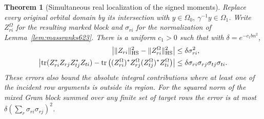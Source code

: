 \documentclass[a4paper,11pt]{article}
\newtheorem{theorem}[proposition]{Theorem}
\theoremstyle{definition}
\theoremstyle{remark}
\numberwithin{equation}{section}
\begin{document}
\begin{theorem}[Simultaneous real localization of the signed moments]
\leavevmode\label{thm:conemoments664}
Replace every original orbital domain by its intersection with
\(y\in\Omega_0,\ \gamma^{-1}y\in\Omega_1\). Write
\(Z_{ri}^{\Omega}\) for the resulting marked block and
\(\sigma_{ri}\) for the normalization of
Lemma~\ref{lem:massranks623}. There is a uniform \(c_1>0\)
such that with \(\delta=e^{-c_1bn^2}\),
\begin{align*}
 \big|\|Z_{ri}\|_{\rm HS}^2-\|Z_{ri}^{\Omega}\|_{\rm HS}^2\big|
   &\le\delta\sigma_{ri}^2,\\
 \left|\operatorname{tr}(Z_{ri}^*Z_{rj}Z_{tj}^*Z_{ti})
 -\operatorname{tr}\big((Z_{ri}^{\Omega})^*Z_{rj}^{\Omega}
                       (Z_{tj}^{\Omega})^*Z_{ti}^{\Omega}\big)\right|
   &\le\delta\sigma_{ri}\sigma_{rj}\sigma_{tj}\sigma_{ti}.
\end{align*}
These errors also bound the absolute integral contributions
where at least one of the incident row arguments is outside its
region. For the squared norm of the mixed Gram block summed over
any finite set of target rows the error is at most
\(\delta(\sum_r\sigma_{ri}\sigma_{rj})^2\).
\end{theorem}
\end{document}
